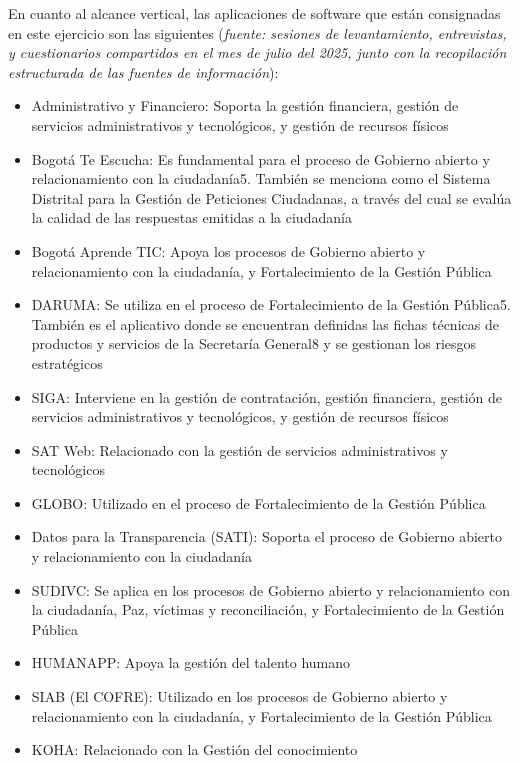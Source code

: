 \documentclass[
	a4paper, %
	12pt, %
]{include/CSSullivanBusinessReport}
\def\tightlist{}
\begin{document}
En cuanto al alcance vertical, las aplicaciones de software que están
consignadas en este ejercicio son las siguientes (\emph{fuente: sesiones
de levantamiento, entrevistas, y cuestionarios compartidos en el mes de
julio del 2025, junto con la recopilación estructurada de las fuentes de
información}):

\begin{itemize}
\tightlist
\item
  Administrativo y Financiero: Soporta la gestión financiera, gestión de
  servicios administrativos y tecnológicos, y gestión de recursos
  físicos
\item
  Bogotá Te Escucha: Es fundamental para el proceso de Gobierno abierto
  y relacionamiento con la ciudadanía5. También se menciona como el
  Sistema Distrital para la Gestión de Peticiones Ciudadanas, a través
  del cual se evalúa la calidad de las respuestas emitidas a la
  ciudadanía
\item
  Bogotá Aprende TIC: Apoya los procesos de Gobierno abierto y
  relacionamiento con la ciudadanía, y Fortalecimiento de la Gestión
  Pública
\item
  DARUMA: Se utiliza en el proceso de Fortalecimiento de la Gestión
  Pública5. También es el aplicativo donde se encuentran definidas las
  fichas técnicas de productos y servicios de la Secretaría General8 y
  se gestionan los riesgos estratégicos
\item
  SIGA: Interviene en la gestión de contratación, gestión financiera,
  gestión de servicios administrativos y tecnológicos, y gestión de
  recursos físicos
\item
  SAT Web: Relacionado con la gestión de servicios administrativos y
  tecnológicos
\item
  GLOBO: Utilizado en el proceso de Fortalecimiento de la Gestión
  Pública
\item
  Datos para la Transparencia (SATI): Soporta el proceso de Gobierno
  abierto y relacionamiento con la ciudadanía
\item
  SUDIVC: Se aplica en los procesos de Gobierno abierto y
  relacionamiento con la ciudadanía, Paz, víctimas y reconciliación, y
  Fortalecimiento de la Gestión Pública
\item
  HUMANAPP: Apoya la gestión del talento humano
\item
  SIAB (El COFRE): Utilizado en los procesos de Gobierno abierto y
  relacionamiento con la ciudadanía, y Fortalecimiento de la Gestión
  Pública
\item
  KOHA: Relacionado con la Gestión del conocimiento

\end{itemize}
\end{document}
